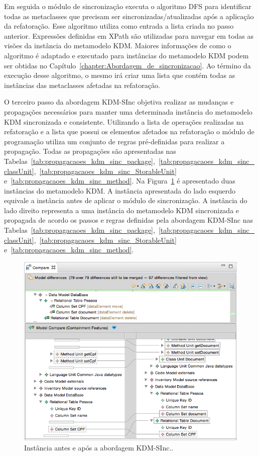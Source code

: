 Em seguida o módulo de sincronização executa o algoritmo DFS para identificar todas as metaclasses que precisam ser sincronizadas/atualizadas após a aplicação da refatoração. Esse algoritmo utiliza como entrada a lista criada no passo anterior. Expressões definidas em XPath são utilizadas para navegar em todas as visões da instância do metamodelo KDM. Maiores informações de como o algoritmo é adaptado e executado para instâncias do metamodelo KDM podem ser obtidas no Capítulo~\ref{chapter:Abordagem_de_sincronizacao}. Ao término da execução desse algoritmo, o mesmo irá criar uma lista que contém todas as instâncias das metaclasses afetadas na refatoração. 
   

O terceiro passo da abordagem KDM-SInc objetiva realizar as mudanças e propagações necessários para manter uma determinada instância do metamodelo KDM sincronizada e consistente. Utilizando a lista de operações realizadas na refatoração e a lista que possui os elementos afetados na refatoração o módulo de programação utiliza um conjunto de regras pré-definidas para realizar a propagação. Todas as propagações são apresentadas nas Tabelas~\ref{tab:propagacaoes_kdm_sinc_package},~\ref{tab:propagacaoes_kdm_sinc_classUnit},~\ref{tab:propagacaoes_kdm_sinc_StorableUnit} e~\ref{tab:propagacaoes_kdm_sinc_method}. Na Figura~\ref{fig:efeitoPropagacaoKDMSINC} é apresentado duas instâncias do metamodelo KDM. A instância apresentada do lado esquerdo equivale a instância antes de aplicar o módulo de sincronização. A instância do lado direito representa a uma instância do metamodelo KDM sincronizada e propagada de acordo os passos e regras definidas pela abordagem KDM-SInc nas Tabelas~\ref{tab:propagacaoes_kdm_sinc_package},~\ref{tab:propagacaoes_kdm_sinc_classUnit},~\ref{tab:propagacaoes_kdm_sinc_StorableUnit} e~\ref{tab:propagacaoes_kdm_sinc_method}.


\begin{figure}[!h]
	\centering
	\caption{Instância antes e após a abordagem KDM-SInc..}
	\label{fig:efeitoPropagacaoKDMSINC}
	\includegraphics[scale=0.7]{images/propagacaoKDMEfeito}
	\fautor
\end{figure}


